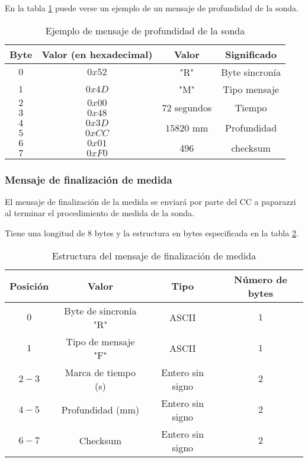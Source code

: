 En la tabla \ref{tab11} puede verse un ejemplo de un mensaje de profundidad de la sonda.

\begin{table}[h]
	\centering
	\caption{Ejemplo de mensaje de profundidad de la sonda}
	\begin{tabular}{|c|c|c|c|}\hline
		\textbf{Byte} 	&	\textbf{Valor (en hexadecimal)}	&\textbf{Valor}	&\textbf{Significado} \\ \hline \hline
		$0$ 			&  $0x52$			& "R"	& Byte sincronía	\\ \hline
		$1$				&  $0x4D$			& "M"	& Tipo mensaje		\\ \hline
		$2$				&  $0x00$			& \multirow{2}{*}{$72$ segundos} & \multirow{2}{*}{Tiempo} \\
		$3$				&  $0x48$			&  & \\ \hline	
		$4$				&  $0x3D$			& \multirow{2}{*}{$15820$ mm} & \multirow{2}{*}{Profundidad} \\
		$5$				&  $0xCC$			&  & \\ \hline	
		$6$				&  $0x01$			&  \multirow{2}{*}{496}	& \multirow{2}{*}{checksum} \\
		$7$				&  $0xF0$			&     &     \\ \hline	
		
		
	\end{tabular}
	\label{tab11}
\end{table}


\subsubsection{Mensaje de finalización de medida}

El mensaje de finalización de la medida se enviará por parte del CC a paparazzi al terminar el procedimiento de medida de la sonda.

Tiene una longitud de $8$ bytes y la estructura en bytes especificada en la tabla \ref{tab12}.

\begin{table}[h]
	\centering
	\caption{Estructura del mensaje  de finalización de medida}
	\begin{tabular}{|c|c|c|c|}\hline 
		\textbf{Posición}	& \textbf{Valor} & \textbf{Tipo} &\textbf{Número de bytes} \\ \hline \hline 
		$0$		& Byte de sincronía "R"				& ASCII	 			&	$1$ \\  \hline
		$1$		& Tipo de mensaje "F"				& ASCII	 			&	$1$ \\  \hline
		$2-3$	& Marca de tiempo (s)				& Entero sin signo	&   $2$ \\  \hline
		$4-5$	& Profundidad (mm)  				& Entero sin signo	&   $2$ \\  \hline
		$6-7$	& Checksum 							& Entero sin signo	&   $2$ \\  \hline
	\end{tabular}
\label{tab12}
\end{table}

